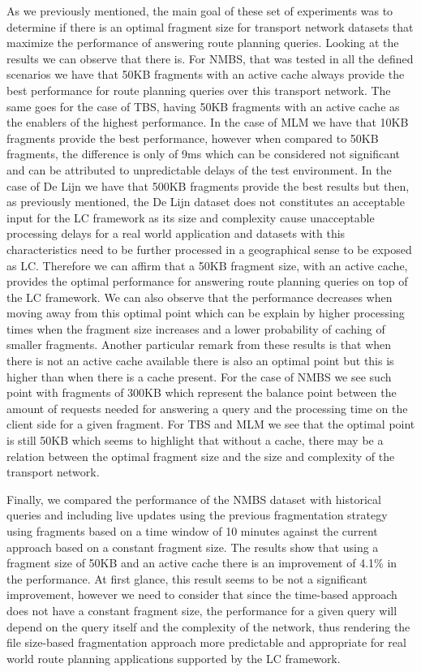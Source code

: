 \documentclass[sw]{iosart2x}
\begin{document}
	As we previously mentioned, the main goal of these set of experiments was to determine if there is an optimal fragment size for transport network datasets that maximize the performance of answering route planning queries. Looking at the results we can observe that there is. For NMBS, that was tested in all the defined scenarios we have that 50KB fragments with an active cache always provide the best performance for route planning queries over this transport network. The same goes for the case of TBS, having 50KB fragments with an active cache as the enablers of the highest performance. In the case of MLM we have that 10KB fragments provide the best performance, however when compared to 50KB fragments, the difference is only of 9ms which can be considered not significant and can be attributed to unpredictable delays of the test environment. In the case of De Lijn we have that 500KB fragments provide the best results but then, as previously mentioned, the De Lijn dataset does not constitutes an acceptable input for the LC framework as its size and complexity cause unacceptable processing delays for a real world application and datasets with this characteristics need to be further processed in a geographical sense to be exposed as LC. Therefore we can affirm that a 50KB fragment size, with an active cache, provides the optimal performance for answering route planning queries on top of the LC framework. We can also observe that the performance decreases when moving away from this optimal point which can be explain by higher processing times when the fragment size increases and a lower probability of caching of smaller fragments. Another particular remark from these results is that when there is not an active cache available there is also an optimal point but this is higher than when there is a cache present. For the case of NMBS we see such point with fragments of 300KB which represent the balance point between the amount of requests needed for answering a query and the processing time on the client side for a given fragment. For TBS and MLM we see that the optimal point is still 50KB which seems to highlight that without a cache, there may be a relation between the optimal fragment size and the size and complexity of the transport network.
	
	Finally, we compared the performance of the NMBS dataset with historical queries and including live updates using the previous fragmentation strategy using fragments based on a time window of 10 minutes  against the current approach based on a constant fragment size. The results show that using a fragment size of 50KB and an active cache there is an improvement of 4.1\% in the performance. At first glance, this result seems to be not a significant improvement, however we need to consider that since the time-based approach does not have a constant fragment size, the performance for a given query will depend on the query itself and the complexity of the network, thus rendering the file size-based fragmentation approach more predictable and appropriate for real world route planning applications supported by the LC framework.  
	
\end{document}
